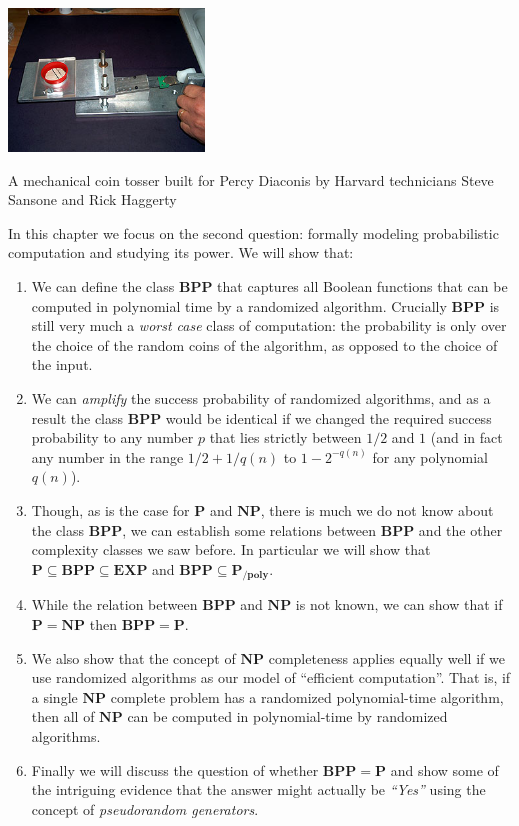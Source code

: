 \begin{marginfigure}
\centering
\includegraphics[width=\linewidth, height=1.5in, keepaspectratio]{../figure/coin_tosser.jpg}
\caption{A mechanical coin tosser built for Percy Diaconis by Harvard
technicians Steve Sansone and Rick Haggerty}
\label{coinfig}
\end{marginfigure}

In this chapter we focus on the second question: formally modeling
probabilistic computation and studying its power. We will show that:

\begin{enumerate}
\def\labelenumi{\arabic{enumi}.}
\item
  We can define the class \(\mathbf{BPP}\) that captures all Boolean
  functions that can be computed in polynomial time by a randomized
  algorithm. Crucially \(\mathbf{BPP}\) is still very much a \emph{worst
  case} class of computation: the probability is only over the choice of
  the random coins of the algorithm, as opposed to the choice of the
  input.
\item
  We can \emph{amplify} the success probability of randomized
  algorithms, and as a result the class \(\mathbf{BPP}\) would be
  identical if we changed the required success probability to any number
  \(p\) that lies strictly between \(1/2\) and \(1\) (and in fact any
  number in the range \(1/2 + 1/q(n)\) to \(1-2^{-q(n)}\) for any
  polynomial \(q(n)\)).
\item
  Though, as is the case for \(\mathbf{P}\) and \(\mathbf{NP}\), there
  is much we do not know about the class \(\mathbf{BPP}\), we can
  establish some relations between \(\mathbf{BPP}\) and the other
  complexity classes we saw before. In particular we will show that
  \(\mathbf{P} \subseteq \mathbf{BPP} \subseteq \mathbf{EXP}\) and
  \(\mathbf{BPP} \subseteq \mathbf{P_{/poly}}\).
\item
  While the relation between \(\mathbf{BPP}\) and \(\mathbf{NP}\) is not
  known, we can show that if \(\mathbf{P}=\mathbf{NP}\) then
  \(\mathbf{BPP}=\mathbf{P}\).
\item
  We also show that the concept of \(\mathbf{NP}\) completeness applies
  equally well if we use randomized algorithms as our model of
  ``efficient computation''. That is, if a single \(\mathbf{NP}\)
  complete problem has a randomized polynomial-time algorithm, then all
  of \(\mathbf{NP}\) can be computed in polynomial-time by randomized
  algorithms.
\item
  Finally we will discuss the question of whether
  \(\mathbf{BPP} = \mathbf{P}\) and show some of the intriguing evidence
  that the answer might actually be \emph{``Yes''} using the concept of
  \emph{pseudorandom generators}.
\end{enumerate}

